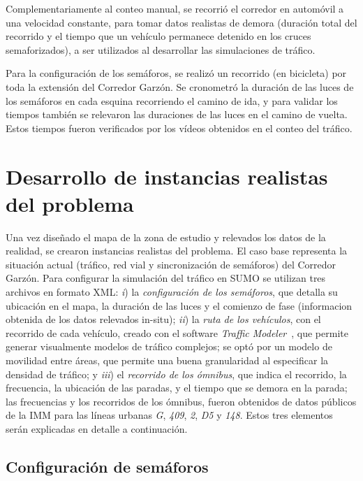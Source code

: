 Complementariamente al conteo manual, se recorrió el corredor en automóvil a una velocidad constante, para tomar datos realistas de demora (duración total del recorrido y el tiempo que un vehículo permanece detenido en los cruces semaforizados),
 a ser utilizados al desarrollar las simulaciones de tráfico. 

Para la configuración de los semáforos, se realizó un recorrido (en bicicleta) por toda la extensión del Corredor Garzón. Se cronometró la duración de las luces de los semáforos en cada esquina recorriendo el camino de ida, y para validar los tiempos también se relevaron las duraciones de las luces en el camino de vuelta. Estos tiempos fueron verificados por los vídeos obtenidos en el conteo del tráfico.


\section{Desarrollo de instancias realistas del problema}

Una vez diseñado el mapa de la zona de estudio y relevados los datos de la realidad, se crearon instancias realistas del problema. El caso base representa la situación actual (tráfico, red vial y sincronización de semáforos) del Corredor Garzón. Para configurar la simulación del tráfico en SUMO se utilizan tres archivos en formato XML: \textit{i}) la \emph{configuración de los semáforos}, que detalla su ubicación en el mapa, la duración de las luces y el comienzo de fase (informacion obtenida de los datos relevados in-situ); \textit{ii}) la \emph{ruta de los vehículos}, con el recorrido de cada vehículo, creado con el software \emph{Traffic Modeler}~\cite{TrafficModeler}, que permite generar visualmente modelos de tráfico complejos; se optó por un modelo de movilidad entre áreas, que permite una buena granularidad al especificar la densidad de tráfico; y \textit{iii}) el \emph{recorrido de los ómnibus}, que indica el recorrido, la frecuencia, la ubicación de las paradas, y el tiempo que se demora en la parada; las frecuencias y los recorridos de los ómnibus, fueron obtenidos de datos públicos de la IMM para las líneas urbanas \textit{G}, \textit{409}, \textit{2}, \textit{D5} y \textit{148}. Estos tres elementos serán explicadas en detalle a continuación.

\subsection{Configuración de semáforos}


